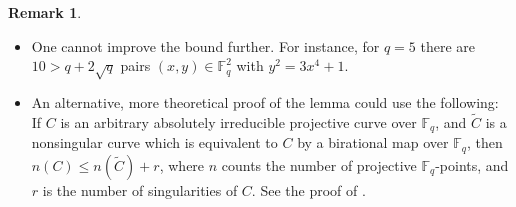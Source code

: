 \documentclass[12pt]{amsart}
\theoremstyle{plain}
\theoremstyle{definition}
\newtheorem{remark}[theorem]{Remark}
\numberwithin{equation}{section}
\newcommand{\FF}{\mathbb F}
\begin{document}
\begin{remark}
  \begin{itemize}
  \item[(a)] One cannot improve the bound further. For instance, for
    $q=5$ there are $10>q+2\sqrt{q}$ pairs $(x,y)\in\FF_q^2$ with
    $y^2=3x^4+1$.
  \item[(b)] An alternative, more theoretical proof of the lemma could
    use the following: If $C$ is an arbitrary absolutely irreducible
    projective curve over $\FF_q$, and $\tilde C$ is a nonsingular
    curve which is equivalent to $C$ by a birational map over $\FF_q$,
    then $n(C)\le n(\tilde C)+r$, where $n$ counts the number of
    projective $\FF_q$-points, and $r$ is the number of singularities
    of $C$. See the proof of \cite[Proposition 2.3]{aubry_perret}.
  \end{itemize}
\end{remark}
\end{document}
